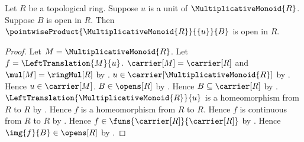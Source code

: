 \begin{theorem}\label{topological_ring_unit_left_multiple_open}
    Let $R$ be a topological ring.
    Suppose $u$ is a unit of $\MultiplicativeMonoid{R}$.
    Suppose $B$ is open in $R$.
    Then $\pointwiseProduct{\MultiplicativeMonoid{R}}{\{u\}}{B}$ is
        open in $R$.
\end{theorem}
\begin{proof}
    Let $M=\MultiplicativeMonoid{R}$.
    Let $f=\LeftTranslation{M}{u}$.
    $\carrier[M]=\carrier[R]$ and $\mul[M]=\ringMul[R]$ by
        .
    $u\in\carrier[\MultiplicativeMonoid{R}]$ by
        .
    Hence $u\in\carrier[M]$.
    $B\in\opens[R]$ by .
    Hence $B\subseteq\carrier[R]$ by .
    $\LeftTranslation{\MultiplicativeMonoid{R}}{u}$ is a
        homeomorphism from $R$ to $R$ by
        .
    Hence $f$ is a homeomorphism from $R$ to $R$.
    Hence $f$ is continuous from $R$ to $R$ by .
    Hence $f\in\funs{\carrier[R]}{\carrier[R]}$ by
        .
    Hence $\img{f}{B}\in\opens[R]$ by
        .


\end{proof}
